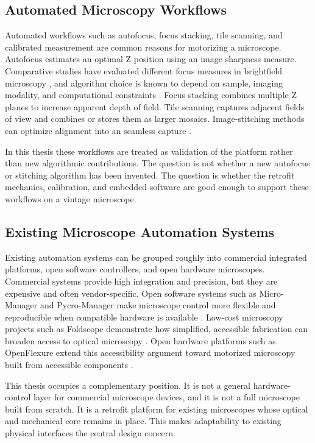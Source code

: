 \subsection{Automated Microscopy Workflows}

Automated workflows such as autofocus, focus stacking, tile scanning, and calibrated measurement are common reasons for motorizing a microscope. Autofocus estimates an optimal Z position using an image sharpness measure. Comparative studies have evaluated different focus measures in brightfield microscopy \cite{pech2000diatom}, and algorithm choice is known to depend on sample, imaging modality, and computational constraints \cite{sun2004autofocusing}. Focus stacking combines multiple Z planes to increase apparent depth of field. Tile scanning captures adjacent fields of view and combines or stores them as larger mosaics. Image-stitching methods can optimize alignment into an seamless capture \cite{preibisch2009globally}.

In this thesis these workflows are treated as validation of the platform rather than new algorithmic contributions. The question is not whether a new autofocus or stitching algorithm has been invented. The question is whether the retrofit mechanics, calibration, and embedded software are good enough to support these workflows on a vintage microscope.

\subsection{Existing Microscope Automation Systems}

Existing automation systems can be grouped roughly into commercial integrated platforms, open software controllers, and open hardware microscopes. Commercial systems provide high integration and precision, but they are expensive and often vendor-specific. Open software systems such as Micro-Manager and Pycro-Manager make microscope control more flexible and reproducible when compatible hardware is available \cite{edelstein2014advanced,pinkard2021pycromanager}. Low-cost microscopy projects such as Foldscope demonstrate how simplified, accessible fabrication can broaden access to optical microscopy \cite{cybulski2014foldscope}. Open hardware platforms such as OpenFlexure extend this accessibility argument toward motorized microscopy built from accessible components \cite{collins2020openflexure}.

This thesis occupies a complementary position. It is not a general hardware-control layer for commercial microscope devices, and it is not a full microscope built from scratch. It is a retrofit platform for existing microscopes whose optical and mechanical core remains in place. This makes adaptability to existing physical interfaces the central design concern.

